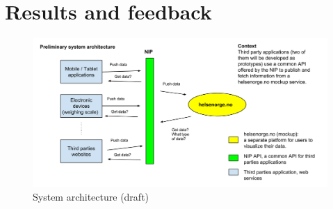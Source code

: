 \section{Results and feedback}

\begin{figure}[h]
\centering
\includegraphics[scale=0.30]{../Figures/architecture-draft.png}
\caption{System architecture (draft)}
\label{figure:architecture-draft}
\end{figure}

